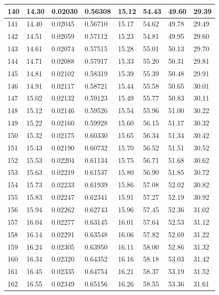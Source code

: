 \documentclass[12pt,a4paper,twoside]{article}
\begin{document}
\begin{center}
\begin{longtable}{l l l l | l l l l}
140 & 14.30 & 0.02030 & 0.56308 & 15.12 & 54.43 & 49.60 & 29.39 \\ \hline
141 & 14.40 & 0.02045 & 0.56710 & 15.17 & 54.62 & 49.78 & 29.49 \\ \hline
142 & 14.51 & 0.02059 & 0.57112 & 15.23 & 54.81 & 49.95 & 29.60 \\ \hline
143 & 14.61 & 0.02074 & 0.57515 & 15.28 & 55.01 & 50.13 & 29.70 \\ \hline
144 & 14.71 & 0.02088 & 0.57917 & 15.33 & 55.20 & 50.31 & 29.81 \\ \hline
145 & 14.81 & 0.02102 & 0.58319 & 15.39 & 55.39 & 50.48 & 29.91 \\ \hline
146 & 14.91 & 0.02117 & 0.58721 & 15.44 & 55.58 & 50.65 & 30.01 \\ \hline
147 & 15.02 & 0.02132 & 0.59123 & 15.49 & 55.77 & 50.83 & 30.11 \\ \hline
148 & 15.12 & 0.02146 & 0.59526 & 15.54 & 55.96 & 51.00 & 30.22 \\ \hline
149 & 15.22 & 0.02160 & 0.59928 & 15.60 & 56.15 & 51.17 & 30.32 \\ \hline
150 & 15.32 & 0.02175 & 0.60330 & 15.65 & 56.34 & 51.34 & 30.42 \\ \hline
151 & 15.43 & 0.02190 & 0.60732 & 15.70 & 56.52 & 51.51 & 30.52 \\ \hline
152 & 15.53 & 0.02204 & 0.61134 & 15.75 & 56.71 & 51.68 & 30.62 \\ \hline
153 & 15.63 & 0.02219 & 0.61537 & 15.80 & 56.90 & 51.85 & 30.72 \\ \hline
154 & 15.73 & 0.02233 & 0.61939 & 15.86 & 57.08 & 52.02 & 30.82 \\ \hline
155 & 15.83 & 0.02247 & 0.62341 & 15.91 & 57.27 & 52.19 & 30.92 \\ \hline
156 & 15.94 & 0.02262 & 0.62743 & 15.96 & 57.45 & 52.36 & 31.02 \\ \hline
157 & 16.04 & 0.02277 & 0.63145 & 16.01 & 57.64 & 52.53 & 31.12 \\ \hline
158 & 16.14 & 0.02291 & 0.63548 & 16.06 & 57.82 & 52.69 & 31.22 \\ \hline
159 & 16.24 & 0.02305 & 0.63950 & 16.11 & 58.00 & 52.86 & 31.32 \\ \hline
160 & 16.34 & 0.02320 & 0.64352 & 16.16 & 58.18 & 53.03 & 31.42 \\ \hline
161 & 16.45 & 0.02335 & 0.64754 & 16.21 & 58.37 & 53.19 & 31.52 \\ \hline
162 & 16.55 & 0.02349 & 0.65156 & 16.26 & 58.55 & 53.36 & 31.61 \\ \hline

\end{longtable}
\end{center}
\end{document}
